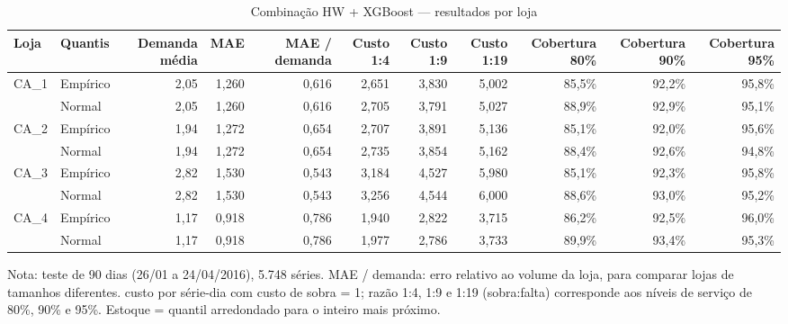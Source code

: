 \begin{table}[htbp]
\centering
\small
\caption{Combinação HW + XGBoost — resultados por loja}
\label{tab:comb_por_loja}
\begin{tabular}{llrrrrrrrrr}
\toprule
Loja & Quantis & Demanda média & MAE & MAE / demanda & Custo 1:4 & Custo 1:9 & Custo 1:19 & Cobertura 80\% & Cobertura 90\% & Cobertura 95\% \\
\midrule
CA\_1 & Empírico & 2,05 & 1,260 & 0,616 & 2,651 & 3,830 & 5,002 & 85,5\% & 92,2\% & 95,8\% \\
 & Normal & 2,05 & 1,260 & 0,616 & 2,705 & 3,791 & 5,027 & 88,9\% & 92,9\% & 95,1\% \\
\addlinespace
CA\_2 & Empírico & 1,94 & 1,272 & 0,654 & 2,707 & 3,891 & 5,136 & 85,1\% & 92,0\% & 95,6\% \\
 & Normal & 1,94 & 1,272 & 0,654 & 2,735 & 3,854 & 5,162 & 88,4\% & 92,6\% & 94,8\% \\
\addlinespace
CA\_3 & Empírico & 2,82 & 1,530 & 0,543 & 3,184 & 4,527 & 5,980 & 85,1\% & 92,3\% & 95,8\% \\
 & Normal & 2,82 & 1,530 & 0,543 & 3,256 & 4,544 & 6,000 & 88,6\% & 93,0\% & 95,2\% \\
\addlinespace
CA\_4 & Empírico & 1,17 & 0,918 & 0,786 & 1,940 & 2,822 & 3,715 & 86,2\% & 92,5\% & 96,0\% \\
 & Normal & 1,17 & 0,918 & 0,786 & 1,977 & 2,786 & 3,733 & 89,9\% & 93,4\% & 95,3\% \\
\bottomrule
\end{tabular}
\par\smallskip
{\footnotesize Nota: teste de 90 dias (26/01 a 24/04/2016), 5.748 séries. MAE / demanda: erro relativo ao volume da loja, para comparar lojas de tamanhos diferentes. custo por série-dia com custo de sobra = 1; razão 1:4, 1:9 e 1:19 (sobra:falta) corresponde aos níveis de serviço de 80\%, 90\% e 95\%. Estoque = quantil arredondado para o inteiro mais próximo.}
\end{table}
